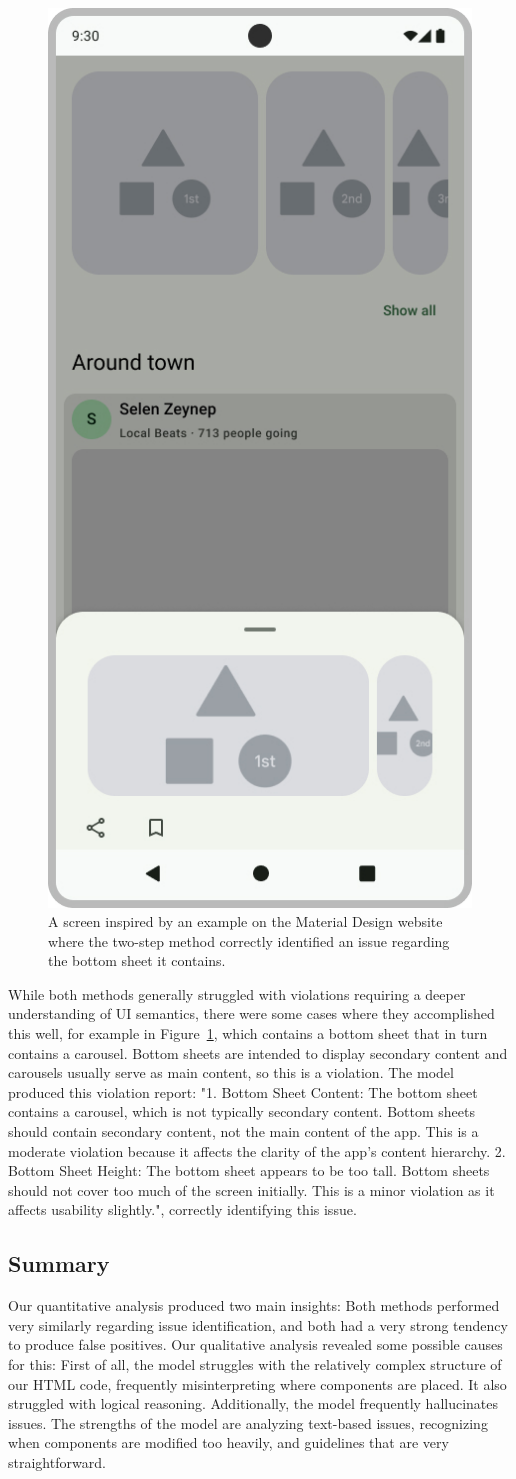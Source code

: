 \documentclass[11pt,titlepage,oneside,openany]{book}
\begin{document}
\begin{figure}[H]
	\centering
	\includegraphics[width=.28\textwidth]{figures/tp_ex_ts_3.jpg}
	\caption{A screen inspired by an example on the Material Design website where the two-step method correctly identified an issue regarding the bottom sheet it contains.}
	\label{fig:tp_ex_ts_3}
\end{figure}

While both methods generally struggled with violations requiring a deeper understanding of UI semantics, there were some cases where they accomplished this well, for example in Figure~\ref{fig:tp_ex_ts_3}, which contains a bottom sheet that in turn contains a carousel. Bottom sheets are intended to display secondary content and carousels usually serve as main content, so this is a violation. The model produced this violation report: "1. Bottom Sheet Content: The bottom sheet contains a carousel, which is not typically secondary content. Bottom sheets should contain secondary content, not the main content of the app. This is a moderate violation because it affects the clarity of the app's content hierarchy. 2. Bottom Sheet Height: The bottom sheet appears to be too tall. Bottom sheets should not cover too much of the screen initially. This is a minor violation as it affects usability slightly.", correctly identifying this issue.

\subsection{Summary}

Our quantitative analysis produced two main insights: Both methods performed very similarly regarding issue identification, and both had a very strong tendency to produce false positives. Our qualitative analysis revealed some possible causes for this: First of all, the model struggles with the relatively complex structure of our HTML code, frequently misinterpreting where components are placed. It also struggled with logical reasoning. Additionally, the model frequently hallucinates issues. The strengths of the model are analyzing text-based issues, recognizing when components are modified too heavily, and guidelines that are very straightforward. 
\end{document}
